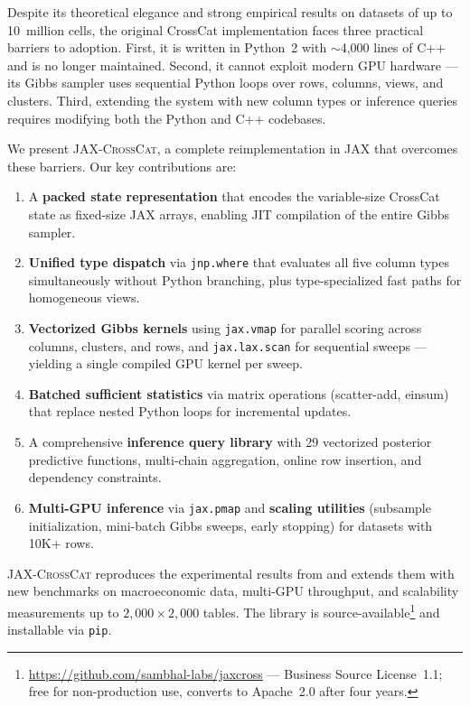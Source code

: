 \documentclass[11pt]{article}
\newcommand{\jaxcc}{\textsc{JAX-CrossCat}}
\begin{document}
Despite its theoretical elegance and strong empirical results on datasets
of up to 10~million cells, the original CrossCat implementation
\citep{mansinghka2016crosscat} faces three practical barriers to
adoption. First, it is written in Python~2 with ${\sim}$4,000 lines
of C++ and is no longer maintained. Second, it cannot exploit modern GPU
hardware --- its Gibbs sampler uses sequential Python loops over rows,
columns, views, and clusters. Third, extending the system with new
column types or inference queries requires modifying both the Python and
C++ codebases.

We present \jaxcc{}, a complete reimplementation in JAX
\citep{jax2018github} that overcomes these barriers. Our key
contributions are:

\begin{enumerate}
  \item A \textbf{packed state representation} that encodes the variable-size
    CrossCat state as fixed-size JAX arrays, enabling JIT compilation of
    the entire Gibbs sampler.
  \item \textbf{Unified type dispatch} via \texttt{jnp.where} that
    evaluates all five column types simultaneously without Python
    branching, plus type-specialized fast paths for homogeneous views.
  \item \textbf{Vectorized Gibbs kernels} using \texttt{jax.vmap} for
    parallel scoring across columns, clusters, and rows, and
    \texttt{jax.lax.scan} for sequential sweeps --- yielding a single
    compiled GPU kernel per sweep.
  \item \textbf{Batched sufficient statistics} via matrix operations
    (scatter-add, einsum) that replace nested Python loops for
    incremental updates.
  \item A comprehensive \textbf{inference query library} with 29
    vectorized posterior predictive functions, multi-chain aggregation,
    online row insertion, and dependency constraints.
  \item \textbf{Multi-GPU inference} via \texttt{jax.pmap} and
    \textbf{scaling utilities} (subsample initialization, mini-batch
    Gibbs sweeps, early stopping) for datasets with 10K+ rows.
\end{enumerate}

\jaxcc{} reproduces the experimental results from
\citet{mansinghka2016crosscat} and extends them with new benchmarks on
macroeconomic data, multi-GPU throughput, and scalability measurements up
to $2{,}000 \times 2{,}000$ tables. The library is
source-available\footnote{\url{https://github.com/sambhal-labs/jaxcross}
--- Business Source License~1.1; free for non-production use, converts to
Apache~2.0 after four years.} and installable via \texttt{pip}.
\end{document}
